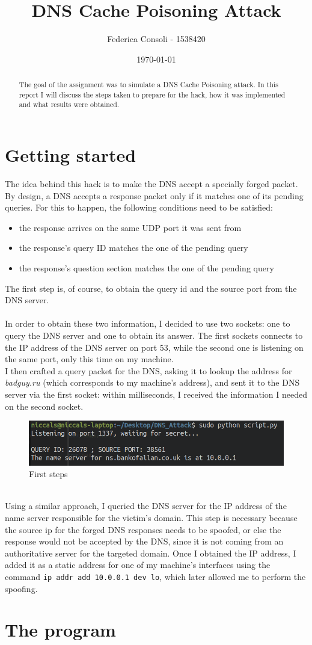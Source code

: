 \documentclass[a4paper]{article}
\title{DNS Cache Poisoning Attack}
\author{Federica Consoli - 1538420}
\date{\today}
\begin{document}
\maketitle

\begin{abstract}
	The goal of the assignment was to simulate a DNS Cache Poisoning attack. In this report I will discuss the steps taken to prepare for the hack, how it was implemented and what results were obtained.
\end{abstract}

\section{Getting started}
\label{sec:q1}
	The idea behind this hack is to make the DNS accept a specially forged packet. By design, a DNS accepts a response packet only if it matches one of its pending queries. For this to happen, the following conditions need to be satisfied:
	\begin{itemize}
		\item the response arrives on the same UDP port it was sent from
		\item the response's query ID matches the one of the pending query
		\item the response's question section matches the one of the pending query
	\end{itemize}
	The first step is, of course, to obtain the query id and the source port from the DNS server.
	\\\\
	In order to obtain these two information, I decided to use two sockets: one to query the DNS server and one to obtain its answer. The first sockets connects to the IP address of the DNS server on port 53, while the second one is listening on the same port, only this time on my machine. \\I then crafted a query packet for the DNS, asking it to lookup the address for \textit{badguy.ru} (which corresponds to my machine's address), and sent it to the DNS server via the first socket: within milliseconds, I received the information I needed on the second socket.\\
	\begin{figure}
		\centering
		\includegraphics[width=0.9\linewidth]{qid_srcport}
		\caption[]{First steps}
		\label{fig:qidsrcport}
	\end{figure}
	\\Using a similar approach, I queried the DNS server for the IP address of the name server responsible for the victim's domain. This step is necessary because the source ip for the forged DNS responses needs to be spoofed, or else the response would not be accepted by the DNS, since it is not coming from an authoritative server for the targeted domain.
	Once I obtained the IP address, I added it as a static address for one of my machine's interfaces using the command \texttt{ip addr add 10.0.0.1 dev lo}, which later allowed me to perform the spoofing.
\section{The program}

	
\end{document}
